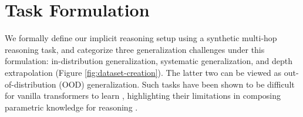 \documentclass{article} %
\newcommand{\hs}[1]{\textcolor{red}{[Huan: #1]}}
\begin{document}
\section{Task Formulation}



We formally define our implicit reasoning setup using a synthetic multi-hop reasoning task, and categorize three generalization challenges under this formulation: in-distribution generalization, systematic generalization, and depth extrapolation (Figure \ref{fig:dataset-creation}).
The latter two can be viewed as out-of-distribution (OOD) generalization. Such tasks have been shown to be difficult for vanilla transformers to learn \citep{yao-etal-2025-language-models}, highlighting their limitations in composing parametric knowledge for reasoning \citep{allen2023physics, yang-etal-2024-large-language-models}.
\end{document}
